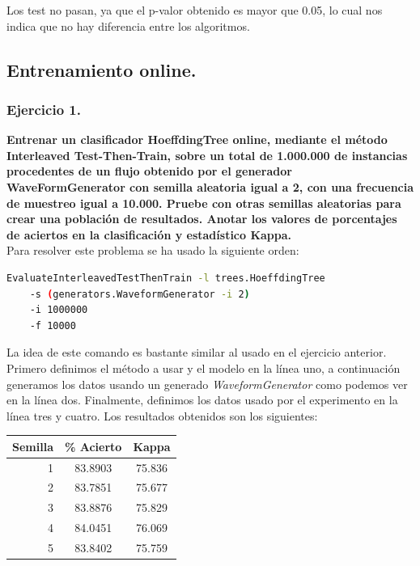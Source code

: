 \documentclass[11pt]{article}
\begin{document}
Los test no pasan, ya que el p-valor obtenido es mayor que 0.05, lo cual nos indica que no hay diferencia entre los algoritmos.

\subsection{Entrenamiento online.}

\subsubsection{Ejercicio 1.}

\textbf{Entrenar un clasificador HoeffdingTree online, mediante el método Interleaved Test-Then-Train, sobre un total de 1.000.000 de instancias procedentes de un flujo obtenido por el generador WaveFormGenerator con semilla aleatoria igual a 2, con una frecuencia de muestreo igual a 10.000. Pruebe con otras semillas aleatorias para crear una población de resultados. Anotar los valores de porcentajes de aciertos en la clasificación y estadístico Kappa.} \\

Para resolver este problema se ha usado la siguiente orden:

\begin{lstlisting}[language=bash]
EvaluateInterleavedTestThenTrain -l trees.HoeffdingTree
	-s (generators.WaveformGenerator -i 2)
	-i 1000000
	-f 10000
\end{lstlisting}

La idea de este comando es bastante similar al usado en el ejercicio anterior. Primero definimos el método a usar y el modelo en la línea uno, a continuación generamos los datos usando un generado \textit{WaveformGenerator} como podemos ver en la línea dos. Finalmente, definimos los datos usado por el experimento en la línea tres y cuatro. Los resultados obtenidos son los siguientes:

\begin{table}[H]
	\centering
	\begin{tabular}{rcc}
		\textbf{Semilla} & \textbf{\% Acierto} & \textbf{Kappa} \\ \hline
		1 & 83.8903 & 75.836 \\
		2 & 83.7851 & 75.677 \\
		3 & 83.8876 & 75.829 \\
		4 & 84.0451 & 76.069 \\
		5 & 83.8402 & 75.759
	\end{tabular}
\end{table}
\end{document}
